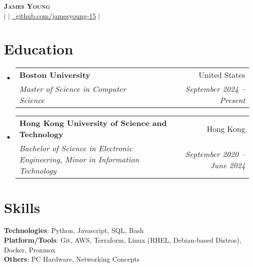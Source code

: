 \documentclass[letterpaper,11pt]{article}
\makeatletter
\newcommand{\resumeItem}[1]{
  \item\small{
    {#1 \vspace{-2pt}}
  }
}
\newcommand{\resumeSubheading}[4]{
  \vspace{-2pt}\item
    \begin{tabular*}{0.97\textwidth}[t]{l@{\extracolsep{\fill}}r}
      \textbf{#1} & #2 \\
      \textit{\small#3} & \textit{\small #4} \\
    \end{tabular*}\vspace{-7pt}
}
\newcommand{\resumeSubHeadingListStart}{\begin{itemize}[leftmargin=0.08in, label={}]}
\newcommand{\resumeSubHeadingListEnd}{\end{itemize}}
\newcommand{\resumeItemListStart}{\begin{itemize}[leftmargin=0.22in]}
\newcommand{\resumeItemListEnd}{\end{itemize}\vspace{-5pt}}
\makeatother
\begin{document}
\begin{center}
    \textbf{\Huge \scshape James Young} \\ \vspace{1pt}
    \small 
    \href{mailto:jamesyoung3931@gmail.com}{} $|$
    \href{https://linkedin.com/in/jamesyyoung}{} $|$
    \href{https://github.com/jamesyoung-15} {\faGithub\ {github.com/jamesyoung-15}} $|$
    \href{https://jyyoung.com}{}
\end{center}


\section{Education}
  \resumeSubHeadingListStart
    \resumeSubheading
        {Boston University}{United States}
        {Master of Science in Computer Science}{September 2024 -- Present}
        \vspace{5pt}
    \resumeSubheading
        {Hong Kong University of Science and Technology}{Hong Kong}
        {Bachelor of Science in Electronic Engineering, Minor in Information Technology}{September 2020 -- June 2024}
  \resumeSubHeadingListEnd

\section{Skills}
 \begin{itemize}[leftmargin=0.08in, label={}]
    \small{\item{
     \textbf{Technologies}{: Python, Javascript, SQL, Bash} \\
     \textbf{Platform/Tools}{: Git, AWS, Terraform, Linux (RHEL, Debian-based Distros), Docker, Proxmox} \\
     \textbf{Others}{: PC Hardware, Networking Concepts} \\
    }}
 \end{itemize}
\end{document}
